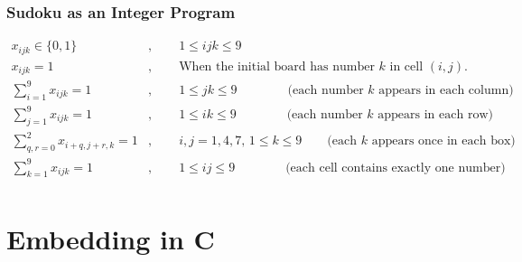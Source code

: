 \documentclass{beamer}
\begin{document}
    \begin{frame}
        \frametitle{Sudoku as an Integer Program}
        \footnotesize
        \begin{align*}
            x_{ijk}\in\{0,1\} &, \qquad 1\leq ijk\leq 9 \\
            x_{ijk} = 1 &,  \qquad\text{When the initial board has number $k$ in cell $(i,j)$.}\\
            \sum_{i=1}^9 x_{ijk} = 1&,\qquad 1\leq jk\leq 9\qquad\qquad\text{(each number $k$ appears in each column)}\\
            \sum_{j=1}^9 x_{ijk} = 1&,\qquad 1\leq ik\leq 9\qquad\qquad\text{(each number $k$ appears in each row)} \\
            \sum_{q,r=0}^2x_{i+q,j+r,k} = 1&, \qquad i,j=1,4,7,\, 1\leq k \leq 9 \qquad\text{(each $k$ appears once in each box)}\\
            \sum_{k=1}^9 x_{ijk} = 1&,\qquad 1\leq ij\leq 9\qquad\qquad\text{(each cell contains exactly one number)} \\
        \end{align*}
    \end{frame}
    \section{Embedding in C}
\end{document}
